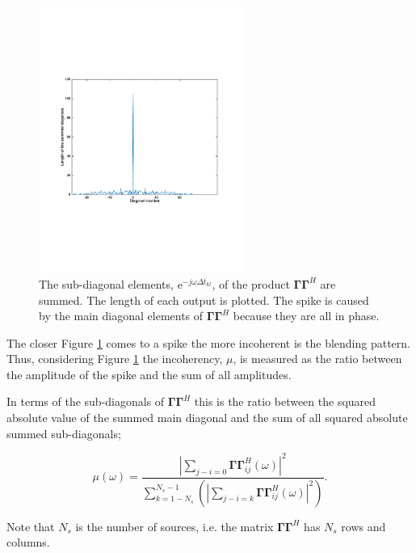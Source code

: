 \begin{figure}
	\centering
	\includegraphics[width=0.6\textwidth]{Plots/diagonal-sums}
	\caption{The sub-diagonal elements, $\mathrm{e}^{-j \omega \Delta t_{kl}}$, of the product $\mathbf{\Gamma \Gamma}^H$ are summed. The length of each output is plotted. The spike is caused by the main diagonal elements of $\mathbf{\Gamma \Gamma}^H$ because they are all in phase.}
	\label{fig:Ch-Results-Diagonal-Sums}
\end{figure}

The closer Figure \ref{fig:Ch-Results-Diagonal-Sums} comes to a spike the more incoherent is the blending pattern. Thus, considering Figure \ref{fig:Ch-Results-Diagonal-Sums} the incoherency, $\mu$, is measured as the ratio between the amplitude of the spike and the sum of all amplitudes. 

In terms of the sub-diagonals of $\mathbf{\Gamma \Gamma}^H$ this is the ratio between the squared absolute value of the summed main diagonal and the sum of all squared absolute summed sub-diagonals;

\begin{equation}
	\mu(\omega) = \frac{  \left| \sum_{j-i = 0} \mathbf{\Gamma \Gamma}^H_{ij} (\omega) \right|^2    }{ \sum_{k = 1-N_s}^{N_s-1}	 \left( \left| \sum_{j-i = k} \mathbf{\Gamma \Gamma}^H_{ij} (\omega) \right|^2 \right)   }.
	\label{eq:Ch-Results-incoherency-monochromatic}
\end{equation}

Note that $N_s$ is the number of sources, i.e. the matrix $\mathbf{\Gamma \Gamma}^H$ has $N_s$ rows and columns.

